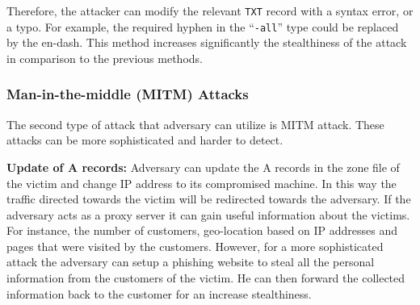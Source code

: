%
%
Therefore, the attacker can modify %
the relevant \texttt{TXT} record with a syntax error, or a typo. 
For example, the required hyphen in the ``\texttt{-all}'' type could be replaced by the en-dash. %
This method increases significantly the stealthiness of the attack in comparison to the previous methods. 

\begin{comment}
\textbf{Deletion or modification of a \texttt{PTR} record:} 
A \texttt{PTR} record, or a reverse DNS of an IP, translates the IP address to its hostname.
The \texttt{PTR} record is used by different services, notably by e-mail anti-spam techniques to protect recipients from phishing attacks.
Most of receiving mail server checks if the IP address of the sending mail server has a \texttt{PTR} record and if it matches the IP obtained via the forward DNS resolution of the hostname defined in the \texttt{PTR} record.
Emails without the \texttt{PTR} record may get rejected or marked as spam, therefore, the adversary could modify or completely delete the \texttt{PTR} record to prevent recipients from receiving legitimate emails.

The tricky part is that the PTR record is not configured by the DNS service provider but by the ISP, so zone poisoning fails.
\end{comment}



\subsubsection{Man-in-the-middle (MITM) Attacks}
The second type of attack that adversary can utilize is MITM attack. These attacks can be more sophisticated and harder to detect. 

\textbf{Update of A records:}
Adversary can update the A records in the zone file of the victim and change IP address to its compromised machine. In this way the traffic directed towards the victim will be redirected towards the adversary. If the adversary acts as a proxy server it can gain useful information about the victims. For instance, the number of customers, geo-location based on IP addresses and pages that were visited by the customers. However, for a more sophisticated attack the adversary can setup a phishing website to steal all the personal information from the customers of the victim. He can then forward the collected information back to the customer for an increase stealthiness. 

